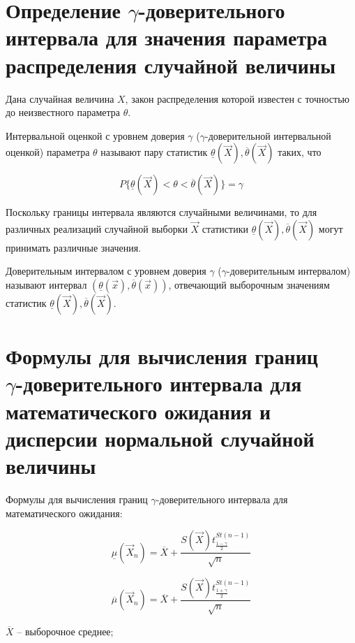 \section{Определение $\gamma$-доверительного интервала для значения параметра распределения случайной величины}

Дана случайная величина $X$, закон распределения которой известен с точностью до неизвестного параметра $\theta$.

Интервальной оценкой с уровнем доверия $\gamma$ ($\gamma$-доверительной интервальной оценкой) параметра $\theta$ называют пару статистик $\underline{\theta}(\vec X), \overline{\theta}(\vec X)$ таких, что

\begin{equation*}
	P\{\underline{\theta}(\vec X)<\theta<\overline{\theta}(\vec X)\}=\gamma
\end{equation*}

Поскольку границы интервала являются случайными величинами, то для различных реализаций случайной выборки $\vec X$ статистики $\underline{\theta}(\vec X), \overline{\theta}(\vec X)$ могут принимать различные значения.

Доверительным интервалом с уровнем доверия $\gamma$ ($\gamma$-доверительным интервалом) называют интервал $(\underline{\theta}(\vec x), \overline{\theta}(\vec x))$, отвечающий выборочным значениям статистик $\underline{\theta}(\vec X), \overline{\theta}(\vec X)$.

\section{Формулы для вычисления границ \\ $\gamma$-доверительного интервала для математического ожидания и дисперсии нормальной случайной величины}

Формулы для вычисления границ $\gamma$-доверительного интервала для математического ожидания:

\begin{equation}
\underline\mu(\vec X_n)=\overline X + \frac{S(\vec X)t^{St(n-1)}_{\frac{1-\gamma}{2}}}{\sqrt{n}}
\end{equation}

\begin{equation}
\overline\mu(\vec X_n)=\overline X + \frac{S(\vec X)t^{St(n-1)}_{\frac{1+\gamma}{2}}}{\sqrt{n}}
\end{equation}

$\overline X$ -- выборочное среднее;

